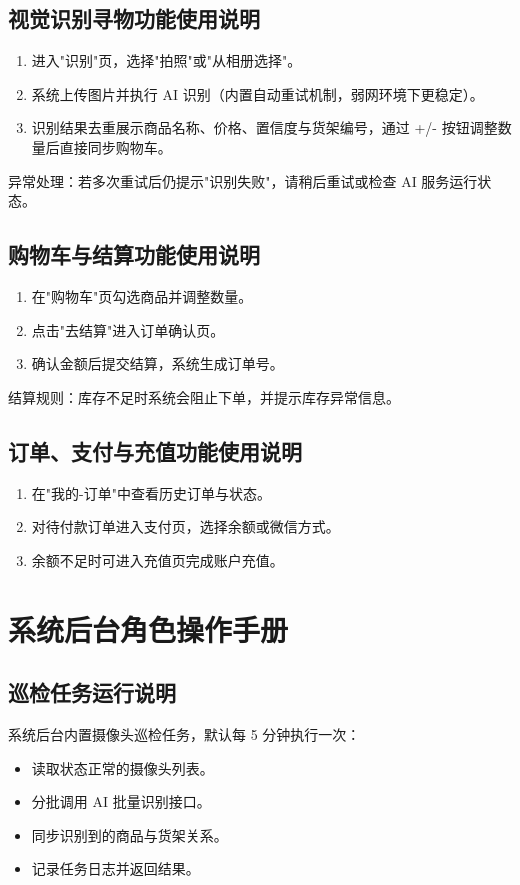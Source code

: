 \subsection{视觉识别寻物功能使用说明}
\begin{enumerate}[leftmargin=2em]
  \item 进入"识别"页，选择"拍照"或"从相册选择"。
  \item 系统上传图片并执行 AI 识别（内置自动重试机制，弱网环境下更稳定）。
  \item 识别结果去重展示商品名称、价格、置信度与货架编号，通过 +/- 按钮调整数量后直接同步购物车。
\end{enumerate}

异常处理：若多次重试后仍提示"识别失败"，请稍后重试或检查 AI 服务运行状态。

\subsection{购物车与结算功能使用说明}
\begin{enumerate}[leftmargin=2em]
  \item 在"购物车"页勾选商品并调整数量。
  \item 点击"去结算"进入订单确认页。
  \item 确认金额后提交结算，系统生成订单号。
\end{enumerate}

结算规则：库存不足时系统会阻止下单，并提示库存异常信息。

\subsection{订单、支付与充值功能使用说明}
\begin{enumerate}[leftmargin=2em]
  \item 在"我的-订单"中查看历史订单与状态。
  \item 对待付款订单进入支付页，选择余额或微信方式。
  \item 余额不足时可进入充值页完成账户充值。
\end{enumerate}

\section{系统后台角色操作手册}

\subsection{巡检任务运行说明}
系统后台内置摄像头巡检任务，默认每 5 分钟执行一次：
\begin{itemize}[leftmargin=2em]
  \item 读取状态正常的摄像头列表。
  \item 分批调用 AI 批量识别接口。
  \item 同步识别到的商品与货架关系。
  \item 记录任务日志并返回结果。
\end{itemize}

